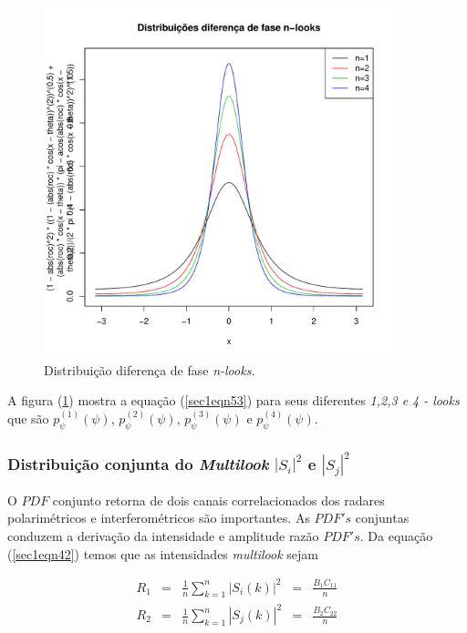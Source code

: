 \documentclass[10pt,a4paper]{article}
\begin{document}
\begin{figure}[!h]
\centering
\includegraphics[width=4.0in]{fig1_eq_18_lee_1994.pdf}
	\caption{Distribuição diferença de fase {\it n-looks}.}
\label{sec1fig1}
\end{figure}

A  figura (\ref{sec1fig1}) mostra a equação (\ref{sec1eqn53}) para seus diferentes {\it 1,2,3 e 4 - looks} que são $p_{\psi}^{(1)}(\psi)$, $p_{\psi}^{(2)}(\psi)$, $p_{\psi}^{(3)}(\psi)$ e $p_{\psi}^{(4)}(\psi)$.

\subsubsection{Distribuição conjunta do {\it Multilook} $|S_i|^2$ e $|S_j|^2$ }

O $PDF$ conjunto retorna de dois canais correlacionados dos radares polarimétricos e interferométricos são importantes. As $PDF's$ conjuntas conduzem a derivação da intensidade e amplitude razão $PDF's$. Da equação (\ref{sec1eqn42}) temos que as intensidades {\it multilook} sejam 

\begin{equation}\label{sec1eqn59}
\begin{array}{ccccc}
	R_1&=&\frac{1}{n}\displaystyle{\sum_{k=1}^{n}|S_i(k)|^2}&=&\frac{B_1C_{11}}{n}\\
	R_2&=&\frac{1}{n}\displaystyle{\sum_{k=1}^{n}|S_j(k)|^2}&=&\frac{B_2C_{22}}{n}\\
\end{array}
\end{equation}
\end{document}
